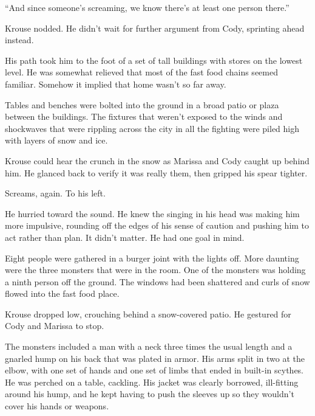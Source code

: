 ``And since someone's screaming, we know there's at least one person there.''



Krouse nodded.  He didn't wait for further argument from Cody, sprinting ahead instead.



His path took him to the foot of a set of tall buildings with stores on the lowest level.  He was somewhat relieved that most of the fast food chains seemed familiar.  Somehow it implied that home wasn't so far away.



Tables and benches were bolted into the ground in a broad patio or plaza between the buildings.  The fixtures that weren't exposed to the winds and shockwaves that were rippling across the city in all the fighting were piled high with layers of snow and ice.



Krouse could hear the crunch in the snow as Marissa and Cody caught up behind him.  He glanced back to verify it was really them, then gripped his spear tighter.



Screams, again.  To his left.



He hurried toward the sound.  He knew the singing in his head was making him more impulsive, rounding off the edges of his sense of caution and pushing him to act rather than plan.  It didn't matter.  He had one goal in mind.



Eight people were gathered in a burger joint with the lights off.  More daunting were the three monsters that were in the room.  One of the monsters was holding a ninth person off the ground.  The windows had been shattered and curls of snow flowed into the fast food place.



Krouse dropped low, crouching behind a snow-covered patio.  He gestured for Cody and Marissa to stop.



The monsters included a man with a neck three times the usual length and a gnarled hump on his back that was plated in armor.   His arms split in two at the elbow, with one set of hands and one set of limbs that ended in built-in scythes.  He was perched on a table, cackling.  His jacket was clearly borrowed, ill-fitting around his hump, and he kept having to push the sleeves up so they wouldn't cover his hands or weapons.



